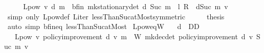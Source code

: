 \begin{isabellebody}
\isanewline
\ \ \isamarkupfalse%
\ \isamarkupfalse%
\ {\isachardoublequoteopen}L{\isacharunderscore}{\kern0pt}pow\ v\ d\ m\ {\isacharequal}{\kern0pt}\ {\isasymnu}\isactrlsub b{\isacharunderscore}{\kern0pt}fin\ {\isacharparenleft}{\kern0pt}mk{\isacharunderscore}{\kern0pt}stationary{\isacharunderscore}{\kern0pt}det\ d{\isacharparenright}{\kern0pt}\ {\isacharparenleft}{\kern0pt}Suc\ m{\isacharparenright}{\kern0pt}\ {\isacharplus}{\kern0pt}\ {\isacharparenleft}{\kern0pt}{\isacharparenleft}{\kern0pt}l\ {\isacharasterisk}{\kern0pt}\isactrlsub R\ {\isasymP}\ {\isacharquery}{\kern0pt}d{\isacharparenright}{\kern0pt}{\isacharcircum}{\kern0pt}{\isacharcircum}{\kern0pt}Suc\ m{\isacharparenright}{\kern0pt}\ v{\isachardoublequoteclose}\isanewline
\ \ \ \ \isamarkupfalse%
\ {\isacharparenleft}{\kern0pt}simp\ only{\isacharcolon}{\kern0pt}\ L{\isacharunderscore}{\kern0pt}pow{\isacharunderscore}{\kern0pt}def\ L{\isacharunderscore}{\kern0pt}iter\ lessThan{\isacharunderscore}{\kern0pt}Suc{\isacharunderscore}{\kern0pt}atMost{\isacharbrackleft}{\kern0pt}symmetric{\isacharbrackright}{\kern0pt}{\isacharparenright}{\kern0pt}\isanewline
\ \ \isamarkupfalse%
\ \isamarkupfalse%
\ {\isacharquery}{\kern0pt}thesis\isanewline
\ \ \ \ \isamarkupfalse%
\ {\isacharparenleft}{\kern0pt}auto\ simp{\isacharcolon}{\kern0pt}\ {\isasymnu}\isactrlsub b{\isacharunderscore}{\kern0pt}fin{\isacharunderscore}{\kern0pt}eq\ lessThan{\isacharunderscore}{\kern0pt}Suc{\isacharunderscore}{\kern0pt}atMost{\isacharparenright}{\kern0pt}\isanewline
{}\isamarkupfalse%
%
\endisatagproof
{\isafoldproof}%
%
\isadelimproof
\isanewline
%
\endisadelimproof
\isanewline
{}\isamarkupfalse%
\ L{\isacharunderscore}{\kern0pt}pow{\isacharunderscore}{\kern0pt}eq{\isacharunderscore}{\kern0pt}W{\isacharcolon}{\kern0pt}\isanewline
\ \ \ {\isachardoublequoteopen}d\ {\isasymin}\ D\isactrlsub D{\isachardoublequoteclose}\ \isanewline
\ \ \ {\isachardoublequoteopen}L{\isacharunderscore}{\kern0pt}pow\ v\ {\isacharparenleft}{\kern0pt}policy{\isacharunderscore}{\kern0pt}improvement\ d\ v{\isacharparenright}{\kern0pt}\ m\ {\isacharequal}{\kern0pt}\ W\ {\isacharparenleft}{\kern0pt}mk{\isacharunderscore}{\kern0pt}dec{\isacharunderscore}{\kern0pt}det\ {\isacharparenleft}{\kern0pt}policy{\isacharunderscore}{\kern0pt}improvement\ d\ v{\isacharparenright}{\kern0pt}{\isacharparenright}{\kern0pt}\ {\isacharparenleft}{\kern0pt}Suc\ m{\isacharparenright}{\kern0pt}\ v{\isachardoublequoteclose}\ \isanewline

\end{isabellebody}
